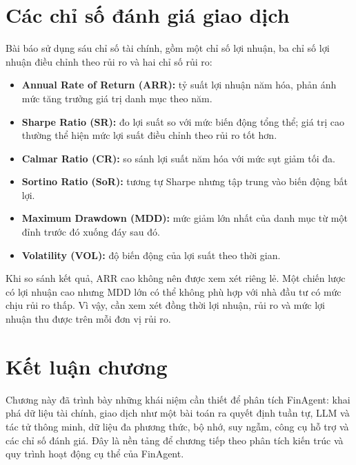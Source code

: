 \section{Các chỉ số đánh giá giao dịch}

Bài báo sử dụng sáu chỉ số tài chính, gồm một chỉ số lợi nhuận, ba chỉ số lợi nhuận điều chỉnh theo rủi ro và hai chỉ số rủi ro:
\begin{itemize}
    \item \textbf{Annual Rate of Return (ARR):} tỷ suất lợi nhuận năm hóa, phản ánh mức tăng trưởng giá trị danh mục theo năm.
    \item \textbf{Sharpe Ratio (SR):} đo lợi suất so với mức biến động tổng thể; giá trị cao thường thể hiện mức lợi suất điều chỉnh theo rủi ro tốt hơn.
    \item \textbf{Calmar Ratio (CR):} so sánh lợi suất năm hóa với mức sụt giảm tối đa.
    \item \textbf{Sortino Ratio (SoR):} tương tự Sharpe nhưng tập trung vào biến động bất lợi.
    \item \textbf{Maximum Drawdown (MDD):} mức giảm lớn nhất của danh mục từ một đỉnh trước đó xuống đáy sau đó.
    \item \textbf{Volatility (VOL):} độ biến động của lợi suất theo thời gian.
\end{itemize}
Khi so sánh kết quả, ARR cao không nên được xem xét riêng lẻ. Một chiến lược có lợi nhuận cao nhưng MDD lớn có thể không phù hợp với nhà đầu tư có mức chịu rủi ro thấp. Vì vậy, cần xem xét đồng thời lợi nhuận, rủi ro và mức lợi nhuận thu được trên mỗi đơn vị rủi ro.

\section{Kết luận chương}
Chương này đã trình bày những khái niệm cần thiết để phân tích FinAgent: khai phá dữ liệu tài chính, giao dịch như một bài toán ra quyết định tuần tự, LLM và tác tử thông minh, dữ liệu đa phương thức, bộ nhớ, suy ngẫm, công cụ hỗ trợ và các chỉ số đánh giá. Đây là nền tảng để chương tiếp theo phân tích kiến trúc và quy trình hoạt động cụ thể của FinAgent.
